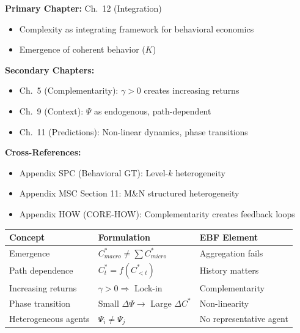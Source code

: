 \begin{tcolorbox}[colback=green!5!white, colframe=green!75!black,
    title=\textbf{Chapter References}]

\textbf{Primary Chapter:} Ch.\ 12 (Integration)
\begin{itemize}[nosep]
    \item Complexity as integrating framework for behavioral economics
    \item Emergence of coherent behavior ($K$)
\end{itemize}

\textbf{Secondary Chapters:}
\begin{itemize}[nosep]
    \item Ch.\ 5 (Complementarity): $\gamma > 0$ creates increasing returns
    \item Ch.\ 9 (Context): $\Psi$ as endogenous, path-dependent
    \item Ch.\ 11 (Predictions): Non-linear dynamics, phase transitions
\end{itemize}

\textbf{Cross-References:}
\begin{itemize}[nosep]
    \item Appendix SPC (Behavioral GT): Level-$k$ heterogeneity
    \item Appendix MSC Section 11: M\&N structured heterogeneity
    \item Appendix HOW (CORE-HOW): Complementarity creates feedback loops
\end{itemize}

\end{tcolorbox}

\begin{tcolorbox}[colback=yellow!5!white, colframe=yellow!75!black,
    title=\textbf{Quick Reference: Key Concepts}]

\renewcommand{\arraystretch}{1.3}
\begin{tabular}{@{}p{4cm}p{5cm}p{4cm}@{}}
\toprule
\textbf{Concept} & \textbf{Formulation} & \textbf{EBF Element} \\
\midrule
Emergence & $C^*_{macro} \neq \sum C^*_{micro}$ & Aggregation fails \\
Path dependence & $C^*_t = f(C^*_{<t})$ & History matters \\
Increasing returns & $\gamma > 0 \Rightarrow$ Lock-in & Complementarity \\
Phase transition & Small $\Delta\Psi \to$ Large $\Delta C^*$ & Non-linearity \\
Heterogeneous agents & $\Psi_i \neq \Psi_j$ & No representative agent \\
\bottomrule
\end{tabular}

\end{tcolorbox}

